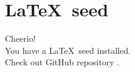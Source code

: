 \section{\LaTeX\ seed} %
\label{sec:latex_seed}

Cheerio!\\
You have a \LaTeX\ seed installed.\\
Check out GitHub repository \cite{githubrepo}.

 